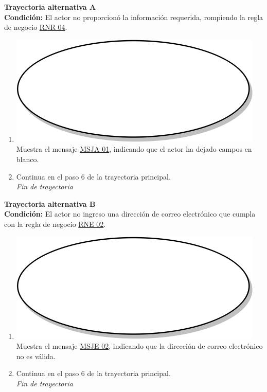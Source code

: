 \textbf{Trayectoria alternativa A} \label{cu1_1_ta_a} \\
\textbf{Condición:} El actor no proporcionó la información requerida, rompiendo la regla de negocio \hyperref[rnr_04]{RNR 04}.\\
 \begin{enumerate}[label=A\arabic*]
    \item {\includegraphics[scale=.05]{Capitulo3/img/proceso.png} Muestra el mensaje \hyperref[msja_01]{MSJA 01}, indicando que el actor ha dejado campos en blanco.}
    \item {Continua en el paso 6  de la trayectoria principal.} \\
    \textit{Fin de trayectoria} \\
\end{enumerate}

\textbf{Trayectoria alternativa B} \label{cu1_1_ta_b}\\
\textbf{Condición:} El actor no ingreso una dirección de correo electrónico que cumpla con la regla de negocio \hyperref[rne_02]{RNE 02}.\\
 \begin{enumerate}[label=B\arabic*]
    \item {\includegraphics[scale=.05]{Capitulo3/img/proceso.png} Muestra el mensaje \hyperref[msje_02]{MSJE 02}, indicando que la dirección de correo electrónico no es válida.}
    \item {Continua en el paso 6 de la trayectoria principal.} \\
    \textit{Fin de trayectoria} \\
\end{enumerate}


